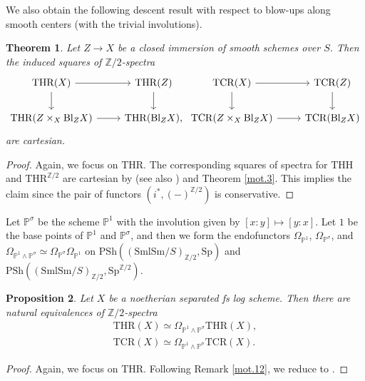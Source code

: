 \documentclass[10pt]{amsart}
\newtheorem{thm}{Theorem}[section]
\newtheorem{prop}[thm]{Proposition}
\theoremstyle{definition}
\theoremstyle{remark}
\numberwithin{equation}{section}
\renewcommand{\P}{\mathbb{P}}
\newcommand{\Z}{\mathbb{Z}}
\newcommand{\PSh}{\mathrm{PSh}}
\newcommand{\Sp}{\mathrm{Sp}}
\newcommand{\SmlSm}{\mathrm{SmlSm}}
\newcommand{\Blow}{\mathrm{Bl}}
\newcommand{\THH}{\mathrm{THH}}
\newcommand{\THR}{\mathrm{THR}}
\newcommand{\TCR}{\mathrm{TCR}}
\newcommand{\Ztwo}{{\mathbb{Z}/2}}
\begin{document}
We also obtain the following descent result with respect to blow-ups along smooth centers (with the trivial involutions).

\begin{thm}
\label{mot.5}
Let $Z\to X$ be a closed immersion of smooth schemes over $S$.
Then the induced squares of $\Ztwo$-spectra
\[
\begin{tikzcd}
\THR(X)\ar[d]\ar[r]&
\THR(Z)\ar[d]
\\
\THR(Z\times_X \Blow_Z X)\ar[r]&
\THR(\Blow_Z X),
\end{tikzcd}
\begin{tikzcd}
\TCR(X)\ar[d]\ar[r]&
\TCR(Z)\ar[d]
\\
\TCR(Z\times_X \Blow_Z X)\ar[r]&
\TCR(\Blow_Z X)
\end{tikzcd}
\]
are cartesian.
\end{thm}
\begin{proof}
Again,
we focus on $\THR$.
The corresponding squares of spectra for $\THH$ and $\THR^{\Z/2}$ are cartesian by \cite[Theorem 7.3.3]{logDM} (see also \cite[Theorem 3.3.5]{logSH}) and Theorem \ref{mot.3}.
This implies the claim since the pair of functors $(i^*,(-)^{\Ztwo})$ is conservative.
\end{proof}







Let $\P^\sigma$ be the scheme $\P^1$ with the involution given by $[x:y]\mapsto [y:x]$.
Let $1$ be the base points of $\P^1$ and $\P^\sigma$,
and then we form the endofunctors
$\Omega_{\P^1}$, $\Omega_{\P^\sigma}$, and $\Omega_{\P^1\wedge \P^\sigma}\simeq \Omega_{\P^\sigma}\Omega_{\P^1}$ on $\PSh((\SmlSm/S)_{\Ztwo},\Sp)$ and $\PSh((\SmlSm/S)_{\Ztwo},\Sp^{\Ztwo})$.

\begin{prop}
\label{mot.7}
Let $X$ be a noetherian separated fs log scheme.
Then there are natural equivalences of $\Ztwo$-spectra
\begin{gather*}
\THR(X)
\simeq
\Omega_{\P^1\wedge \P^\sigma}\THR(X),
\\
\TCR(X)
\simeq
\Omega_{\P^1\wedge \P^\sigma}\TCR(X).
\end{gather*}
\end{prop}
\begin{proof}
Again,
we focus on $\THR$.
Following Remark \ref{mot.12},
we reduce to \cite[Proposition 5.1.5]{THR}.
\end{proof}
\end{document}
